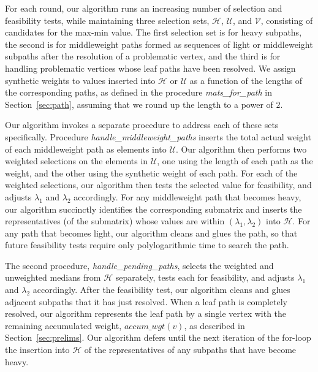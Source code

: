For each round, our algorithm runs an increasing number of selection and feasibility tests, while maintaining three selection sets, $\mathcal{H}$, $\mathcal{U}$, and $\mathcal{V}$, consisting of candidates for the max-min value. 
The first selection set is for heavy subpaths, the second is for middleweight paths formed as sequences of light or middleweight subpaths after the resolution of a problematic vertex, and the third is for handling problematic vertices whose leaf paths have been resolved. 
We assign synthetic weights to values inserted into $\mathcal{H}$ or $\mathcal{U}$ as a function of the lengths of the corresponding paths, as defined in the procedure {\it mats\_for\_path} in Section~\ref{sec:path}, assuming that we round up the length to a power of $2$.  

Our algorithm invokes a separate procedure to address each of these sets specifically. 
Procedure {\it handle\_middleweight\_paths} inserts the total actual weight of each middleweight path as elements into $\mathcal{U}$. 
Our algorithm then performs two weighted selections on the elements in $\mathcal{U}$, one using the length of each path as the weight, and the other using the synthetic weight of each path. 
For each of the weighted selections, our algorithm then tests the selected value for feasibility, and adjusts $\lambda_1$ and $\lambda_2$ accordingly. 
For any middleweight path that becomes heavy, our algorithm succinctly identifies the corresponding submatrix and inserts the representatives (of the submatrix) whose values are within $(\lambda_1,\lambda_2)$ into $\mathcal{H}$.
For any path that becomes light, our algorithm cleans and glues the path, so that future feasibility tests require only polylogarithmic time to search the path.

The second procedure, {\it handle\_pending\_paths}, selects the weighted and unweighted medians from $\mathcal{H}$ separately, tests each for feasibility, and adjusts $\lambda_1$ and $\lambda_2$ accordingly. 
After the feasibility test, our algorithm cleans and glues adjacent subpaths that it has just resolved. 
When a leaf path is completely resolved, our algorithm represents the leaf path by a single vertex with the remaining accumulated weight, $accum\_wgt(v)$, as described in Section~\ref{sec:prelims}. 
Our algorithm defers until the next iteration of the for-loop the insertion into $\mathcal{H}$ of the representatives of any subpaths that have become heavy.

